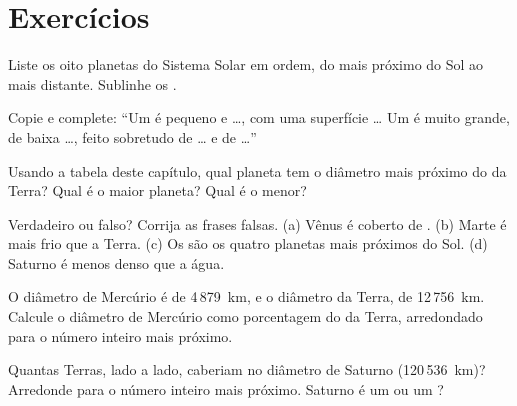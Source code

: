 \section{Exercícios}

\begin{exercise}[$\star$]\label{exo:g6:earth-a-planet:1}
Liste os oito planetas do Sistema Solar em ordem, do mais próximo do Sol
ao mais distante. Sublinhe os .
\end{exercise}

\begin{exercise}[$\star$]\label{exo:g6:earth-a-planet:2}
Copie e complete: ``Um  é pequeno e \ldots, com uma
superfície \ldots{} Um  é muito grande, de baixa \ldots,
feito sobretudo de \ldots{} e de \ldots{}''
\end{exercise}

\begin{exercise}[$\star$]\label{exo:g6:earth-a-planet:3}
Usando a tabela deste capítulo, qual planeta tem o diâmetro mais próximo do
da Terra? Qual é o maior planeta? Qual é o menor?
\end{exercise}

\begin{exercise}[$\star$]\label{exo:g6:earth-a-planet:4}
Verdadeiro ou falso? Corrija as frases falsas.
(a) Vênus é coberto de .
(b) Marte é mais frio que a Terra.
(c) Os  são os quatro planetas mais próximos do Sol.
(d) Saturno é menos denso que a água.
\end{exercise}

\begin{exercise}[$\star\star$]\label{exo:g6:earth-a-planet:5}
O diâmetro de Mercúrio é de 4\,879~km, e o diâmetro da Terra, de
12\,756~km. Calcule o diâmetro de Mercúrio como porcentagem do da Terra,
arredondado para o número inteiro mais próximo.
\end{exercise}

\begin{exercise}[$\star\star$]\label{exo:g6:earth-a-planet:6}
Quantas Terras, lado a lado, caberiam no diâmetro de Saturno
(120\,536~km)? Arredonde para o número inteiro mais próximo. Saturno é um
 ou um ?
\end{exercise}

